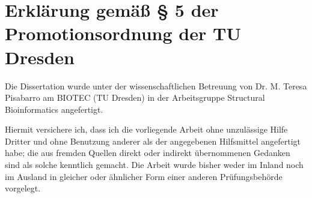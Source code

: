 



\chapter*{Erklärung gemäß § 5 der Promotionsordnung der TU Dresden}

Die Dissertation wurde unter der wissenschaftlichen Betreuung von Dr. M. Teresa
Pisabarro am BIOTEC (TU Dresden) in der Arbeitsgruppe Structural Bioinformatics
angefertigt.

Hiermit versichere ich, dass ich die vorliegende Arbeit ohne unzulässige Hilfe
Dritter und ohne Benutzung anderer als der angegebenen Hilfsmittel angefertigt
habe; die aus fremden Quellen direkt oder indirekt übernommenen Gedanken sind
als solche kenntlich gemacht. Die Arbeit wurde bisher weder im Inland noch im
Ausland in gleicher oder ähnlicher Form einer anderen Prüfungsbehörde vorgelegt.

\vspace{2cm}

\noindent
{}